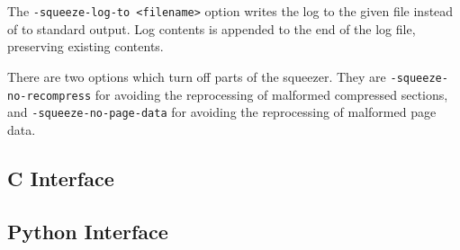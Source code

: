 \documentclass{book}
\begin{document}
\noindent The \texttt{-squeeze-log-to <filename>} option writes the log to the given file instead of to standard output. Log contents is appended to the end of the log file, preserving existing contents.

There are two options which turn off parts of the squeezer. They are \texttt{-squeeze-no-recompress} for avoiding the reprocessing of malformed compressed sections, and \texttt{-squeeze-no-page-data} for avoiding the reprocessing of malformed page data.

\begin{cpdflib}
\clearpage
\section*{C Interface}
\begin{small}\tt

\end{small}
\end{cpdflib}

\begin{pycpdflib}
\clearpage
\section*{Python Interface}
\begin{small}\tt

\end{small}
\end{pycpdflib}
\end{document}
